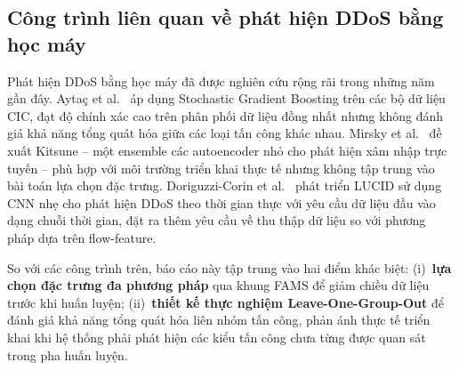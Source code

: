 \subsection{Công trình liên quan về phát hiện DDoS bằng học máy}

Phát hiện DDoS bằng học máy đã được nghiên cứu rộng rãi trong những năm gần đây. Aytaç et al.~\cite{aytac2020} áp dụng Stochastic Gradient Boosting trên các bộ dữ liệu CIC, đạt độ chính xác cao trên phân phối dữ liệu đồng nhất nhưng không đánh giá khả năng tổng quát hóa giữa các loại tấn công khác nhau. Mirsky et al.~\cite{kitsune} đề xuất Kitsune -- một ensemble các autoencoder nhỏ cho phát hiện xâm nhập trực tuyến -- phù hợp với môi trường triển khai thực tế nhưng không tập trung vào bài toán lựa chọn đặc trưng. Doriguzzi-Corin et al.~\cite{lucid} phát triển LUCID sử dụng CNN nhẹ cho phát hiện DDoS theo thời gian thực với yêu cầu dữ liệu đầu vào dạng chuỗi thời gian, đặt ra thêm yêu cầu về thu thập dữ liệu so với phương pháp dựa trên flow-feature.

So với các công trình trên, báo cáo này tập trung vào hai điểm khác biệt: (i)~\textbf{lựa chọn đặc trưng đa phương pháp} qua khung FAMS để giảm chiều dữ liệu trước khi huấn luyện; (ii)~\textbf{thiết kế thực nghiệm Leave-One-Group-Out} để đánh giá khả năng tổng quát hóa liên nhóm tấn công, phản ánh thực tế triển khai khi hệ thống phải phát hiện các kiểu tấn công chưa từng được quan sát trong pha huấn luyện.
